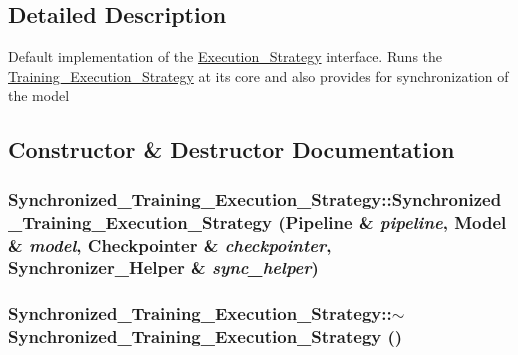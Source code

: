 \subsection{Detailed Description}
Default implementation of the \hyperlink{class_execution___strategy}{Execution\_\-Strategy} interface. Runs the \hyperlink{class_training___execution___strategy}{Training\_\-Execution\_\-Strategy} at its core and also provides for synchronization of the model 

\subsection{Constructor \& Destructor Documentation}
\hypertarget{class_synchronized___training___execution___strategy_a8535193e2ad9ec0b80dbaf2ba82af453}{
\subsubsection[{Synchronized\_\-Training\_\-Execution\_\-Strategy}]{\setlength{\rightskip}{0pt plus 5cm}Synchronized\_\-Training\_\-Execution\_\-Strategy::Synchronized\_\-Training\_\-Execution\_\-Strategy ({\bf Pipeline} \& {\em pipeline}, \/  {\bf Model} \& {\em model}, \/  {\bf Checkpointer} \& {\em checkpointer}, \/  {\bf Synchronizer\_\-Helper} \& {\em sync\_\-helper})}}
\label{class_synchronized___training___execution___strategy_a8535193e2ad9ec0b80dbaf2ba82af453}
\hypertarget{class_synchronized___training___execution___strategy_a055e17959d75203bfdcc5919439eddd7}{
\subsubsection[{$\sim$Synchronized\_\-Training\_\-Execution\_\-Strategy}]{\setlength{\rightskip}{0pt plus 5cm}Synchronized\_\-Training\_\-Execution\_\-Strategy::$\sim$Synchronized\_\-Training\_\-Execution\_\-Strategy ()}}
\label{class_synchronized___training___execution___strategy_a055e17959d75203bfdcc5919439eddd7}


